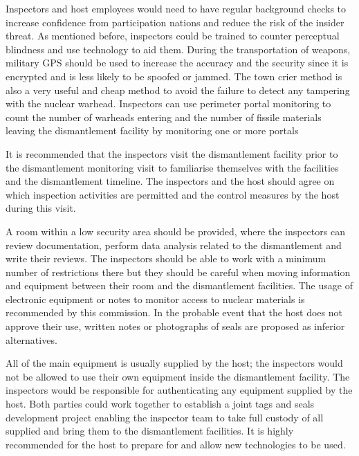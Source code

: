 \documentclass[twoside,titlepage,11pt,twocolumn,a4paper]{article}
\begin{document}
Inspectors and host employees would need to have regular background
checks to increase confidence from participation nations and reduce
the risk of the insider threat. As mentioned before, inspectors could
be trained to counter perceptual blindness and use technology to aid
them. During the transportation of weapons, military GPS should be
used to increase the accuracy and the security since it is encrypted
and is less likely to be spoofed or jammed. The town crier method is
also a very useful and cheap method to avoid the failure to detect any
tampering with the nuclear warhead. Inspectors can use perimeter
portal monitoring to count the number of warheads entering and the
number of fissile materials leaving the dismantlement facility by
monitoring one or more portals

It is recommended that the inspectors visit the dismantlement facility
prior to the dismantlement monitoring visit to familiarise themselves
with the facilities and the dismantlement timeline. The inspectors and
the host should agree on which inspection activities are permitted and
the control measures by the host during this visit.

A room within a low security area should be provided, where the
inspectors can review documentation, perform data analysis related to
the dismantlement and write their reviews. The inspectors should be
able to work with a minimum number of restrictions there but they
should be careful when moving information and equipment between their
room and the dismantlement facilities. The usage of electronic
equipment or notes to monitor access to nuclear materials is
recommended by this commission. In the probable event that the host
does not approve their use, written notes or photographs of seals are
proposed as inferior alternatives.

All of the main equipment is usually supplied by the host; the
inspectors would not be allowed to use their own equipment inside the
dismantlement facility. The inspectors would be responsible for
authenticating any equipment supplied by the host. Both parties could
work together to establish a joint tags and seals development project
enabling the inspector team to take full custody of all supplied and
bring them to the dismantlement facilities. It is highly recommended
for the host to prepare for and allow new technologies to be used.
\end{document}
